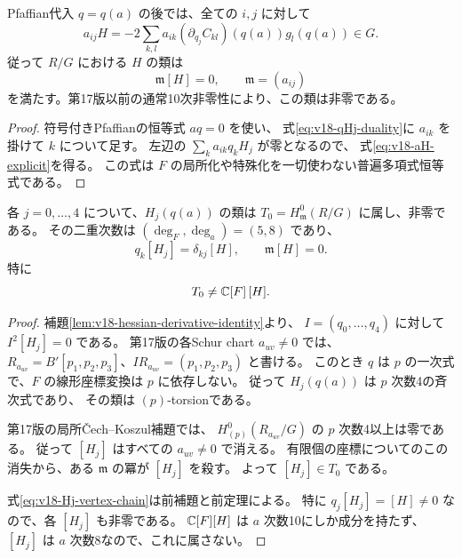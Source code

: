 \begin{theorem}[全座標に殺されるHessian類]
\label{thm:v18-H-vertex-socle}
Pfaffian代入 $q=q(a)$ の後では、全ての $i,j$ に対して
\begin{equation}\label{eq:v18-aH-explicit}
 a_{ij}H
 =-2\sum_{k,l}a_{ik}(\partial_{q_j}C_{kl})(q(a))g_l(q(a))
 \in G.
\end{equation}
従って $R/G$ における $H$ の類は
\[
 \mathfrak m[H]=0,
 \qquad\mathfrak m=(a_{ij})
\]
を満たす。第17版以前の通常10次非零性により、この類は非零である。
\end{theorem}

\begin{proof}
符号付きPfaffianの恒等式 $aq=0$ を使い、
式\eqref{eq:v18-qHj-duality}に $a_{ik}$ を掛けて $k$ について足す。
左辺の $\sum_k a_{ik}q_kH_j$ が零となるので、
式\eqref{eq:v18-aH-explicit}を得る。
この式は $F$ の局所化や特殊化を一切使わない普遍多項式恒等式である。
\end{proof}

\begin{proposition}[全頂点加群にはHessian以外も存在する]
\label{prop:v18-Hj-vertex-torsion}
各 $j=0,\ldots,4$ について、$H_j(q(a))$ の類は
$T_0=H^0_{\mathfrak m}(R/G)$ に属し、非零である。
その二重次数は $(\deg_F,\deg_a)=(5,8)$ であり、
\begin{equation}\label{eq:v18-Hj-vertex-chain}
 q_k[H_j]=\delta_{kj}[H],\qquad
 \mathfrak m[H]=0.
\end{equation}
特に
\[
 T_0\ne\mathbb C[F]\,[H].
\]
\end{proposition}

\begin{proof}
補題\ref{lem:v18-hessian-derivative-identity}より、
$I=(q_0,\ldots,q_4)$ に対して $I^2[H_j]=0$ である。
第17版の各Schur chart $a_{uv}\ne0$ では、
$R_{a_{uv}}=B'[p_1,p_2,p_3]$、$IR_{a_{uv}}=(p_1,p_2,p_3)$ と書ける。
このとき $q$ は $p$ の一次式で、$F$ の線形座標変換は $p$ に依存しない。
従って $H_j(q(a))$ は $p$ 次数4の斉次式であり、
その類は $(p)$-torsionである。

第17版の局所Čech--Koszul補題では、
$H^0_{(p)}(R_{a_{uv}}/G)$ の $p$ 次数4以上は零である。
従って $[H_j]$ はすべての $a_{uv}\ne0$ で消える。
有限個の座標についてのこの消失から、ある $\mathfrak m$ の冪が $[H_j]$ を殺す。
よって $[H_j]\in T_0$ である。

式\eqref{eq:v18-Hj-vertex-chain}は前補題と前定理による。
特に $q_j[H_j]=[H]\ne0$ なので、各 $[H_j]$ も非零である。
$\mathbb C[F][H]$ は $a$ 次数10にしか成分を持たず、
$[H_j]$ は $a$ 次数8なので、これに属さない。
\end{proof}

